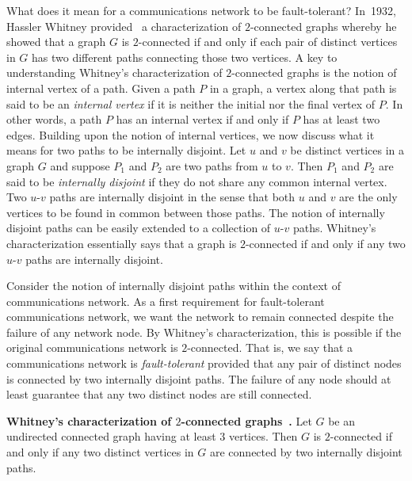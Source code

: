What does it mean for a communications
network to be fault-tolerant? In~1932,
Hassler Whitney provided~\cite{Whitney1932} a
characterization of $2$-connected graphs whereby he showed that a
graph $G$ is $2$-connected if and only if each pair of distinct
vertices in $G$ has two different paths connecting those two
vertices. A key to understanding Whitney's characterization of
$2$-connected graphs is the notion of internal vertex of a path. Given
a path $P$ in a graph, a vertex along that path is said to be an
\emph{internal vertex} if it is neither the
initial nor the final vertex of $P$. In other words, a path $P$ has an
internal vertex if and only if $P$ has at least two edges. Building
upon the notion of internal vertices, we now discuss what it means for
two paths to be internally disjoint. Let $u$ and $v$ be distinct
vertices in a graph $G$ and suppose $P_1$ and $P_2$ are two paths from
$u$ to $v$. Then $P_1$ and $P_2$ are said to be
\emph{internally disjoint} if they
do not share any common internal vertex. Two $u$-$v$ paths are
internally disjoint in the sense that both $u$ and $v$ are the only
vertices to be found in common between those paths. The notion of
internally disjoint paths can be easily extended to a collection of
$u$-$v$ paths. Whitney's characterization essentially says that a
graph is $2$-connected if and only if any two $u$-$v$ paths are
internally disjoint.

Consider the notion of internally disjoint paths within the context of
communications network. As a first
requirement for fault-tolerant communications network, we want the
network to remain connected despite the failure of any network
node. By Whitney's characterization, this is possible if the original
communications network is $2$-connected. That is, we say that a
communications network is \emph{fault-tolerant}
provided that any pair of distinct nodes is connected by two
internally disjoint paths. The failure of any node should at least
guarantee that any two distinct nodes are still connected.

\begin{theorem}
\label{thm:distance_connectivity:Whitney_characterization_2_connected_graphs}
\textbf{Whitney's characterization of $2$-connected graphs~\cite{Whitney1932}.}
Let $G$ be an undirected connected graph having at least $3$
vertices. Then $G$ is $2$-connected if and only if any two distinct
vertices in $G$ are connected by two internally disjoint paths.
\end{theorem}

